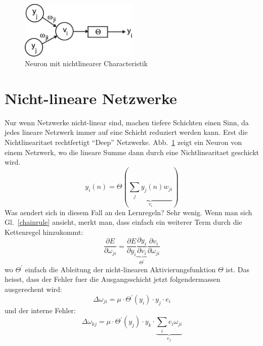 \documentclass[12pt]{article}
\begin{document}
\begin{figure}[!hbt]
\begin{center}
\mbox{\includegraphics[width=0.5\textwidth]{nonlin}}
\end{center}
\caption{Neuron mit nichtlinearer Characteristik
\label{nonlin}}
\end{figure}

\section{Nicht-lineare Netzwerke}
Nur wenn Netzwerke nicht-linear sind, machen tiefere Schichten einen Sinn, da jedes lineare Netzwerk immer auf eine Schicht reduziert werden kann.
Erst die Nichtlinearitaet rechtfertigt ``Deep'' Netzwerke.
Abb.~\ref{nonlin} zeigt ein Neuron von einem Netzwerk, wo die lineare Summe dann durch eine Nichtlinearitaet geschickt wird.
\begin{equation}
  y_i(n) = \Theta(\underbrace{\sum_j y_j(n) w_{ji}}_{v_i}) \label{linear_sum}
\end{equation}
Was aendert sich in diesem Fall an den Lernregeln? Sehr wenig. Wenn man sich Gl.~\ref{chainrule} ansieht, merkt man, dass einfach
ein weiterer Term durch die Kettenregel hinzukommt:
 \begin{equation}
 \frac{\partial E}{\partial \omega_{ji}}  = \frac{\partial E}{\partial y_i} \underbrace{\frac{\partial y_i}{\partial v_i}}_{\Theta^\prime} \frac{\partial v_i}{\partial \omega_{ji}}
 \end{equation}
 wo $\Theta^\prime$ einfach die Ableitung der nicht-linearen Aktivierungsfunktion $\Theta$ ist. Das heisst, dass der Fehler fuer die
 Ausgangsschicht jetzt folgendermassen ausgerechent wird:
\begin{equation}
  \Delta\omega_{ji} = \mu \cdot \Theta^\prime(y_i) \cdot y_j \cdot e_i 
\end{equation}
und der interne Fehler:
\begin{equation}
\Delta\omega_{kj} = \mu \cdot \Theta^\prime(y_j) \cdot y_k \cdot \underbrace{\sum_i e_i \omega_{ji}}_{e_j} 
\end{equation}
\end{document}

